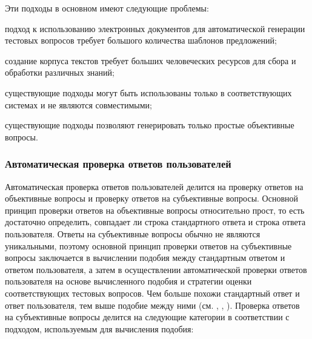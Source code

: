 Эти подходы в основном имеют следующие проблемы:

\begin{textitemize}
	\item подход к использованию электронных документов для автоматической генерации тестовых вопросов требует большого количества шаблонов предложений;
	\item создание корпуса текстов требует больших человеческих ресурсов для сбора и обработки различных знаний;
	\item существующие подходы могут быть использованы только в соответствующих системах и не являются совместимыми;
	\item существующие подходы позволяют генерировать только простые объективные вопросы.
\end{textitemize}

\subsubsection{Автоматическая проверка ответов пользователей}

Автоматическая проверка ответов пользователей делится на проверку ответов на объективные вопросы и проверку ответов на субъективные вопросы. Основной принцип проверки ответов на объективные вопросы относительно прост, то есть достаточно определить, совпадает ли строка стандартного ответа и строка ответа пользователя. Ответы на субъективные вопросы обычно не являются уникальными, поэтому основной принцип проверки ответов на субъективные вопросы заключается в вычислении подобия между стандартным ответом и ответом пользователя, а затем в осуществлении автоматической проверки ответов пользователя на основе вычисленного подобия и стратегии оценки соответствующих тестовых вопросов. Чем больше похожи стандартный ответ и ответ пользователя, тем выше подобие между ними (см. , , ). Проверка ответов на субъективные вопросы делится на следующие категории в соответствии с подходом, используемым для вычисления подобия:


